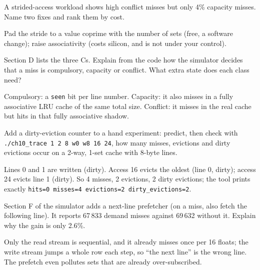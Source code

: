 \begin{exercise}[medium]
A strided-access workload shows high conflict misses but only 4\%
capacity misses. Name two fixes and rank them by cost.
\end{exercise}
\begin{solution}[hint]
Pad the stride to a value coprime with the number of sets (free, a
software change); raise associativity (costs silicon, and is not under
your control).
\end{solution}

\begin{exercise}[medium]
Section D lists the three Cs. Explain from the code how the simulator
decides that a miss is compulsory, capacity or conflict. What extra
state does each class need?
\end{exercise}
\begin{solution}[hint]
Compulsory: a \texttt{seen} bit per line number. Capacity: it also
misses in a fully associative LRU cache of the same total size. Conflict:
it misses in the real cache but hits in that fully associative shadow.
\end{solution}

\begin{exercise}[hard]
Add a dirty-eviction counter to a hand experiment: predict, then check
with \texttt{./ch10\_trace 1 2 8 w0 w8 16 24}, how many misses, evictions
and dirty evictions occur on a 2-way, 1-set cache with 8-byte lines.
\end{exercise}
\begin{solution}[hint]
Lines 0 and 1 are written (dirty). Access 16 evicts the oldest (line
0, dirty); access 24 evicts line 1 (dirty). So 4 misses, 2 evictions,
2 dirty evictions; the tool prints exactly
\texttt{hits=0 misses=4 evictions=2 dirty\_evictions=2}.
\end{solution}

\begin{exercise}[hard]
Section F of the simulator adds a next-line prefetcher (on a miss, also
fetch the following line). It reports 67\,833 demand misses against 69\,632
without it. Explain why the gain is only 2.6\%.
\end{exercise}
\begin{solution}[hint]
Only the read stream is sequential, and it already misses once per 16
floats; the write stream jumps a whole row each step, so ``the next
line'' is the wrong line. The prefetch even pollutes sets that are already
over-subscribed.
\end{solution}

